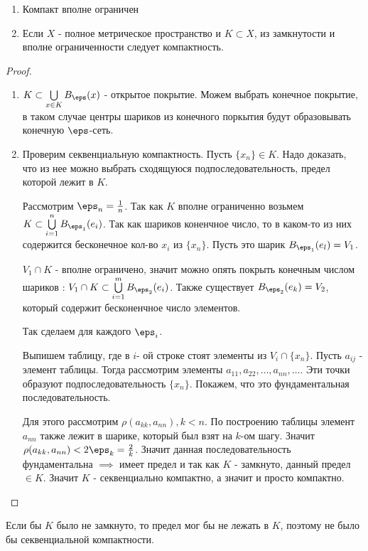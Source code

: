 \begin{theorem}[Хаусдорфа] \thmslashn

  \begin{enumerate}
    \item Компакт вполне ограничен 
    \item Если $X$ - полное метрическое пространство и $K \subset X$, из замкнутости и вполне ограниченности следует компактность.
  \end{enumerate}

  \begin{proof} \thmslashn

    \begin{enumerate}
      \item $K \subset \bigcup\limits_{x \in K}{B_{\eps}(x)}$ - открытое покрытие. Можем выбрать конечное покрытие, в таком случае центры шариков из конечного поркытия будут образовывать конечную $\eps$-сеть.
      \item Проверим секвенциальную компактность. Пусть $\{x_n\} \in K$. Надо доказать, что из нее можно выбрать сходящуюся подпоследовательность, предел которой лежит в $K$. \par
        Рассмотрим $\eps_n = \frac{1}{n}$. 
        Так как $K$ вполне ограниченно возьмем $K \subset \bigcup\limits_{i = 1}^{n}{B_{\eps_1}(e_i)}$.
        Так как шариков коненчное число, то в каком-то из них содержится бесконечное кол-во $x_i$ из $\{x_n\}$. Пусть это шарик $B_{\eps_1}(e_l) = V_1$. \par
      $V_1 \cap K$ - вполне ограничено, значит можно опять покрыть конечным числом шариков : $V_1\cap K \subset \bigcup\limits_{i = 1}^{m}{B_{\eps_2}(e_i)}$. Также существует $B_{\eps_2}(e_k) = V_2$, который содержит бесконенчное число элементов. \par
      Так сделаем для каждого $\eps_i$. \par
      Выпишем таблицу, где в $i$- ой строке стоят элементы из $V_i \cap \{x_n\}$. Пусть $a_{ij}$ - элемент таблицы. Тогда рассмотрим элементы $a_{11}, a_{22}, \dots, a_{nn}, \dots$. Эти точки образуют подпоследовательность $\{x_n\}$. Покажем, что это фундаментальная последовательность. \par
      Для этого рассмотрим $\rho(a_{kk}, a_{nn}), k < n$. По построению таблицы элемент $a_{nn}$ также лежит в шарике, который был взят на $k$-ом шагу. Значит $\rho(a_{kk}, a_{nn}) < 2\eps_{k} = \frac{2}{k}$. Значит данная последовательность фундаментальна $\implies$ имеет предел и так как $K$ - замкнуто, данный предел $\in K$. Значит $K$ - секвенциально компактно, а значит и просто компактно. 
    \end{enumerate}
  \end{proof}
  \begin{remark} \thmslashn

    Если бы $K$ было не замкнуто, то предел мог бы не лежать в $K$, поэтому не было бы секвенциальной компактности.
  \end{remark}
\end{theorem}

